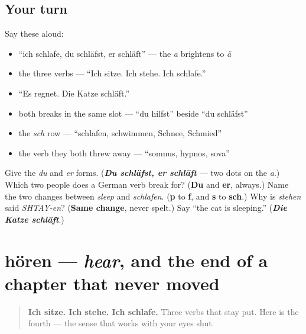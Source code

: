 \subsection*{Your turn}
Say these aloud:

\begin{itemize}
\raggedright
  \item \textquotedblleft{}ich schlafe, du schläfst, er schläft\textquotedblright{} — the \emph{a} brightens to \emph{ä}
  \item the three verbs — \textquotedblleft{}Ich sitze. Ich stehe. Ich schlafe.\textquotedblright{}
  \item \textquotedblleft{}Es regnet. Die Katze schläft.\textquotedblright{}
  \item both breaks in the same slot — \textquotedblleft{}du hilfst\textquotedblright{} beside \textquotedblleft{}du schläfst\textquotedblright{}
  \item the \emph{sch} row — \textquotedblleft{}schlafen, schwimmen, Schnee, Schmied\textquotedblright{}
  \item the verb they both threw away — \textquotedblleft{}somnus, hypnos, sova\textquotedblright{}
\end{itemize}

\begin{tcolorbox}[breakable,colback=teal!4,colframe=teal!35!black,title={Before you move on}]
Give the \emph{du} and \emph{er} forms. (\emph{\textbf{Du schläfst, er schläft}} — two dots on the \emph{a}.) Which two people does a German verb break for? (\textbf{Du} and \textbf{er}, always.) Name the two changes between \emph{sleep} and \emph{schlafen}. (\textbf{p} to \textbf{f}, and \textbf{s} to \textbf{sch}.) Why is \emph{stehen} said \emph{SHTAY-en}? (\textbf{Same change}, never spelt.) Say \textquotedblleft{}the cat is sleeping.\textquotedblright{} (\emph{\textbf{Die Katze schläft}}.)
\end{tcolorbox}
\section[hören]{hören — \emph{hear}, and the end of a chapter that never moved}

\label{lesson:GE-C26-hoeren}



\begin{quote}
\textbf{Ich sitze. Ich stehe. Ich schlafe.} Three verbs that stay put. Here is the fourth — the sense that works with your eyes shut.
\end{quote}

